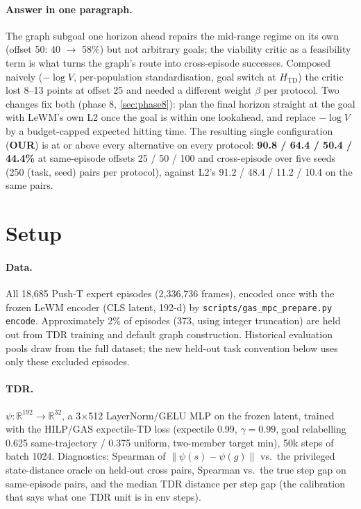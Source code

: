 \documentclass[11pt]{article}
\newcommand{\psiT}{\psi}
\newcommand{\Htd}{H_{\mathrm{TD}}}
\begin{document}
\paragraph{Answer in one paragraph.} The graph subgoal one horizon ahead repairs the mid-range
regime on its own (offset 50: 40 $\to$ 58\%) but not arbitrary goals; the viability critic as a
feasibility term is what turns the graph's route into cross-episode successes. Composed
naively ($-\log V$, per-population standardisation, goal switch at $\Htd$) the critic lost
8--13 points at offset 25 and needed a different weight $\beta$ per protocol. Two changes fix
both (phase 8, \cref{sec:phase8}): plan the final horizon straight at the goal with LeWM's own
L2 once the goal is within one lookahead, and replace $-\log V$ by a budget-capped expected
hitting time. The resulting single configuration (\textbf{OUR}) is at or above every alternative
on every protocol: \textbf{90.8 / 64.4 / 50.4 / 44.4\%} at same-episode offsets 25 / 50 / 100
and cross-episode over five seeds (250 (task, seed) pairs per protocol), against L2's
91.2 / 48.4 / 11.2 / 10.4 on the same pairs.

\section{Setup}
\paragraph{Data.} All 18,685 Push-T expert episodes (2,336,736 frames), encoded once with
the frozen LeWM encoder (CLS latent, 192-d) by \texttt{scripts/gas\_mpc\_prepare.py encode}.
Approximately 2\% of episodes (373, using integer truncation) are held out from TDR
training and default graph construction. Historical evaluation pools draw from the full
dataset; the new held-out task convention below uses only these excluded episodes.

\paragraph{TDR.} $\psiT:\mathbb{R}^{192}\to\mathbb{R}^{32}$, a 3$\times$512 LayerNorm/GELU
MLP on the frozen latent, trained with the HILP/GAS expectile-TD loss (expectile 0.99,
$\gamma=0.99$, goal relabelling 0.625 same-trajectory / 0.375 uniform, two-member target
min), 50k steps of batch 1024. Diagnostics: Spearman of $\|\psiT(s)-\psiT(g)\|$ vs.\ the
privileged state-distance oracle on held-out cross pairs, Spearman vs.\ the true step gap
on same-episode pairs, and the median TDR distance per step gap (the calibration that says
what one TDR unit is in env steps).
\end{document}
